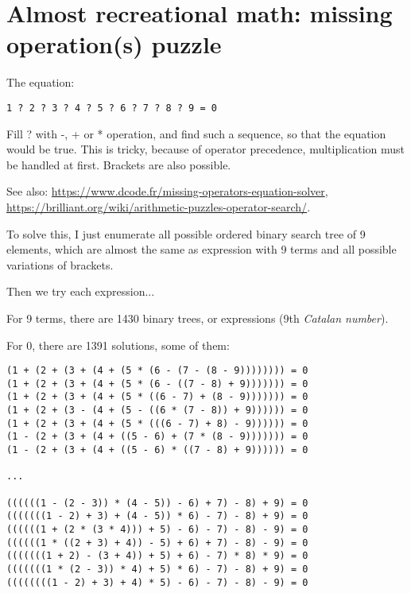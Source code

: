 \section{Almost recreational math: missing operation(s) puzzle}

The equation:

\begin{lstlisting}
1 ? 2 ? 3 ? 4 ? 5 ? 6 ? 7 ? 8 ? 9 = 0
\end{lstlisting}

Fill ? with -, + or * operation, and find such a sequence, so that the equation would be true.
This is tricky, because of operator precedence, multiplication must be handled at first.
Brackets are also possible.

See also:
\url{https://www.dcode.fr/missing-operators-equation-solver}, \\
\url{https://brilliant.org/wiki/arithmetic-puzzles-operator-search/}.

To solve this, I just enumerate all possible ordered binary search tree of 9 elements, which are
almost the same as expression with 9 terms and all possible variations of brackets.

Then we try each expression...



For 9 terms, there are 1430 binary trees, or expressions (9th \emph{Catalan number}).

For 0, there are 1391 solutions, some of them:

\begin{lstlisting}
(1 + (2 + (3 + (4 + (5 * (6 - (7 - (8 - 9)))))))) = 0                                                     
(1 + (2 + (3 + (4 + (5 * (6 - ((7 - 8) + 9))))))) = 0
(1 + (2 + (3 + (4 + (5 * ((6 - 7) + (8 - 9))))))) = 0
(1 + (2 + (3 - (4 + (5 - ((6 * (7 - 8)) + 9)))))) = 0
(1 + (2 + (3 + (4 + (5 * (((6 - 7) + 8) - 9)))))) = 0
(1 - (2 + (3 + (4 + ((5 - 6) + (7 * (8 - 9))))))) = 0
(1 - (2 + (3 + (4 + ((5 - 6) * ((7 - 8) + 9)))))) = 0

...

((((((1 - (2 - 3)) * (4 - 5)) - 6) + 7) - 8) + 9) = 0
(((((((1 - 2) + 3) + (4 - 5)) * 6) - 7) - 8) + 9) = 0
((((((1 + (2 * (3 * 4))) + 5) - 6) - 7) - 8) - 9) = 0
((((((1 * ((2 + 3) + 4)) - 5) + 6) + 7) - 8) - 9) = 0
(((((((1 + 2) - (3 + 4)) + 5) + 6) - 7) * 8) * 9) = 0
(((((((1 * (2 - 3)) * 4) + 5) * 6) - 7) - 8) + 9) = 0
((((((((1 - 2) + 3) + 4) * 5) - 6) - 7) - 8) - 9) = 0  
\end{lstlisting}

